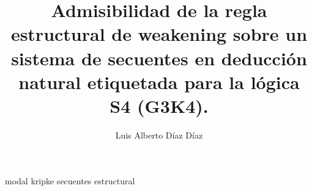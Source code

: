 \documentclass[12pt,twoside,a4paper]{report}
\begin{document}
\title{Admisibilidad de la regla estructural de weakening sobre un sistema de secuentes en deducción natural etiquetada para la lógica S4 (G3K4).}

\author{Luis Alberto Díaz Díaz}

\maketitle


{modal}
{kripke}
{secuentes}
{estructural}
\end{document}
